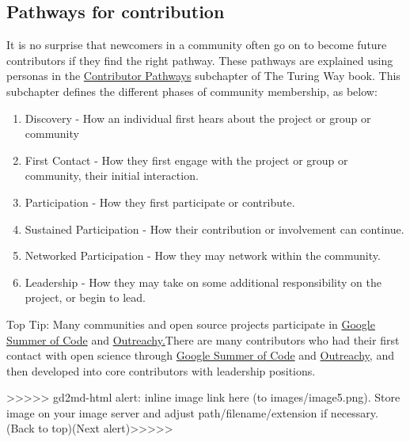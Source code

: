 \documentclass[
  letterpaper,
  DIV=11,
  numbers=noendperiod]{scrreport}
\providecommand{\tightlist}{%
  \setlength{\itemsep}{0pt}\setlength{\parskip}{0pt}}\usepackage{longtable,booktabs,array}
\begin{document}
\hypertarget{pathways-for-contribution}{%
\subsection{\texorpdfstring{\textbf{Pathways for
contribution}}{Pathways for contribution}}\label{pathways-for-contribution}}

It is no surprise that newcomers in a community often go on to become
future contributors if they find the right pathway. These pathways are
explained using personas in the
\href{https://the-turing-way.netlify.app/project-design/persona/persona-contributors.html?highlight=community\%20practice}{Contributor
Pathways} subchapter of The Turing Way book. This subchapter defines the
different phases of community membership, as below:

\begin{enumerate}
\def\labelenumi{\arabic{enumi}.}
\tightlist
\item
  Discovery - How an individual first hears about the project or group
  or community
\item
  First Contact - How they first engage with the project or group or
  community, their initial interaction.
\item
  Participation - How they first participate or contribute.
\item
  Sustained Participation - How their contribution or involvement can
  continue.
\item
  Networked Participation - How they may network within the community.
\item
  Leadership - How they may take on some additional responsibility on
  the project, or begin to lead.
\end{enumerate}

Top Tip: Many communities and open source projects participate in
\href{https://summerofcode.withgoogle.com/archive/}{Google Summer of
Code} and \href{https://www.outreachy.org/}{Outreachy.}There are many
contributors who had their first contact with open science through
\href{https://summerofcode.withgoogle.com/archive/}{Google Summer of
Code} and \href{https://www.outreachy.org/}{Outreachy}, and then
developed into core contributors with leadership positions.

{\textgreater\textgreater\textgreater\textgreater\textgreater{}
gd2md-html alert: inline image link here (to images/image5.png). Store
image on your image server and adjust path/filename/extension if
necessary. }(Back to top)(Next
alert){\textgreater\textgreater\textgreater\textgreater\textgreater{} }
\end{document}
